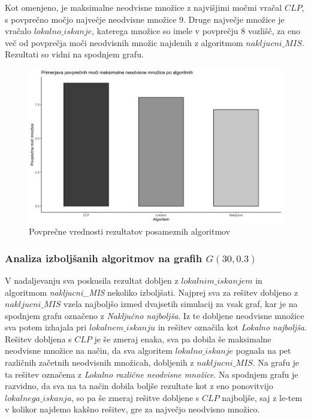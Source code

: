 \documentclass[a4paper, 12pt]{article}
\begin{document}
\newpage
\noindent Kot omenjeno, je maksimalne neodvisne množice z najvišjimi močmi vračal $CLP$, s povprečno močjo največje neodvisne množice 9. Druge največje množice je vračalo $lokalno\_iskanje$,
katerega množice so imele v povprečju 8 vozlišč, za eno več od povprečja moči neodvisnih množic najdenih z algoritmom $nakljucni\_MIS$. Rezultati so vidni na spodnjem grafu.

\begin{figure}[h!]
	\begin{center}
		\includegraphics[scale=0.10]{R_koda/pon-povpmoc.png}
		\caption{Povprečne vrednosti rezultatov posameznih algoritmov}
	\end{center}
\end{figure}

\subsubsection{Analiza izboljšanih algoritmov na grafih $G(30, 0.3)$}

\noindent V nadaljevanju sva poskusila rezultat dobljen z $lokalnim\_iskanjem$ in algoritmom \textit{nakljucni\_MIS} nekoliko izboljšati. 
Najprej sva za rešitev dobljeno z $nakljucni\_MIS$ vzela najboljšo izmed dvajsetih simulacij za vsak graf, kar je na spodnjem grafu označeno z 
\textit{Naključno najboljša}. Iz te dobljene neodvisne množice sva potem izhajala pri $lokalnem\_iskanju$ in rešitev označila kot
\textit{Lokalno najboljša}. Rešitev dobljena s $CLP$ je še zmeraj enaka, sva pa dobila še maksimalne neodvisne množice na način, da sva algoritem $lokalno\_iskanje$
pognala na pet različnih začetnih neodvisnih množicah, dobljenih z $nakljucni\_MIS$. Na grafu je ta rešitev označena z \textit{Lokalno različne neodvisne množice}. Na spodnjem grafu je razvidno, 
da sva na ta način dobila boljše rezultate kot z eno ponovitvijo $lokalnega\_iskanja$, so pa še zmeraj rešitve dobljene s $CLP$ najboljše, saj z le-tem v kolikor najdemo kakšno rešitev, gre za največjo neodvisno množico.
\end{document}
